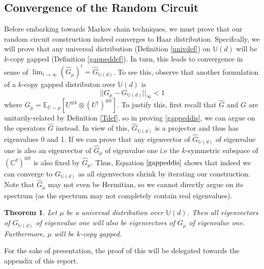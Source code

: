 \documentclass[12pt]{amsart}
\newtheorem{theorem}{Theorem}[section]
\theoremstyle{definition}
\theoremstyle{remark}
\numberwithin{equation}{section}
\theoremstyle{remark}
\begin{document}
\subsection{Convergence of the Random Circuit}
Before embarking towards Markov chain techniques, we must prove that our random circuit construction indeed converges to Haar distribution. Specifcally, we will prove that any universal distribution (Definition \ref{univdef}) on $\mathbb{U}(d)$ will be $k$-copy gapped (Definition \ref{gappeddef}). In turn, this leads to convergence in sense of $\lim_{t \rightarrow \infty} (\widehat{G}_{\mu})^{t} = \widehat{G}_{\mathbb{U}(d)}$. To see this, observe that another formulation of a $k$-copy gapped distributon over $\mathbb{U}(d)$ is
\begin{equation} \label{gappeddis}
  ||G_{\mu} - G_{\mathbb{U}(d)}||_\infty < 1
\end{equation}
where $G_{\mu} = \mathbb{E}_{U \sim \mu} \left[ U^{\otimes k} \otimes (U^\dagger)^{\otimes k} \right]$. To justify this, first recall that $\widehat{G}$ and $G$ are unitarily-related by Definition \ref{Tdef}, so in proving \ref{gappeddis}, we can argue on the operators $\widehat{G}$ instead. In view of this, $\widehat{G}_{\mathbb{U}(d)}$ is a projector and thus has eigenvalues 0 and 1. If we can prove that any eigenvector of $\widehat{G}_{\mathbb{U}(d)}$ of eigenvalue one is also an eigenvector of $\widehat{G}_{\mu}$ of eigenvalue one i.e the $k$-symmetric subspace of $(\mathbb{C}^d)^{\otimes k}$ is also fixed by $\widehat{G}_{\mu}$. Thus, Equation $\ref{gappeddis}$ shows that indeed we can converge to $G_{\mathbb{U}(d)}$ as all eigenvectors shrink by iterating our construction. Note that $\widehat{G}_{\mu}$ may not even be Hermitian, so we cannot directly argue on its spectrum (as the spectrum may not completely contain real eigenvalues).
%
\begin{theorem} \label{convergence}
  Let $\mu$ be a universal distribution over $\mathbb{U}(d)$. Then all eigenvectors of $G_{\mathbb{U}(d)}$ of eigenvalue one will also be eigenvectors of $G_{\mu}$ of eigenvalue one. Furthermore, $\mu$ will be $k$-copy gapped.
\end{theorem}
%
\noindent For the sake of presentation, the proof of this will be delegated towards the appendix of this report.
%
\end{document}
